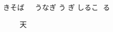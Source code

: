 \documentclass[12pt]{article}
\begin{document}
\thispagestyle{empty}

きそば
𛀥𛁛𛂦゙
うなぎ
う𛂁ぎ
しるこ
𛁈る𛀸

𛁋𛁅
てんぷら
天𛂱゚𛃭
すし

\renewcommand{\indexname}{お品書き}
\printindex
\end{document}

